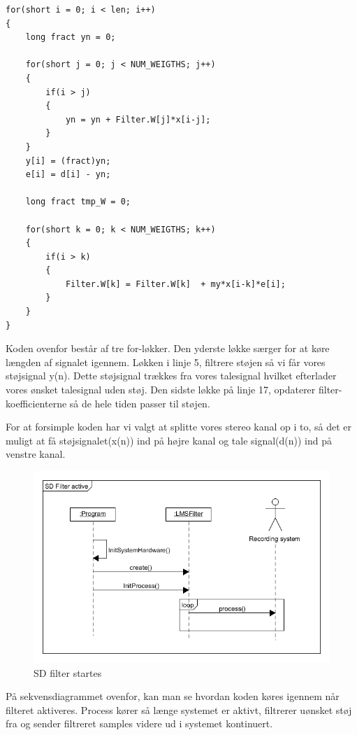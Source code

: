 \newpage


\begin{lstlisting}
for(short i = 0; i < len; i++)
{
	long fract yn = 0;

	for(short j = 0; j < NUM_WEIGTHS; j++)
	{
		if(i > j)
		{
			yn = yn + Filter.W[j]*x[i-j];
		}
	}
	y[i] = (fract)yn;
	e[i] = d[i] - yn;
		
	long fract tmp_W = 0;
		
	for(short k = 0; k < NUM_WEIGTHS; k++)
	{
		if(i > k)
		{
			Filter.W[k] = Filter.W[k]  + my*x[i-k]*e[i];
		}
	}
}
\end{lstlisting}

Koden ovenfor består af tre for-løkker. Den yderste løkke særger for at køre længden af signalet igennem. Løkken i linje 5, filtrere støjen så vi får vores støjsignal y(n). Dette støjsignal trækkes fra vores talesignal hvilket efterlader vores ønsket talesignal uden støj. Den sidste løkke på linje 17, opdaterer filter-koefficienterne så de hele tiden passer til støjen.

For at forsimple koden har vi valgt at splitte vores stereo kanal op i to, så det er muligt at få støjsignalet(x(n)) ind på højre kanal og tale signal(d(n)) ind på venstre kanal.


\begin{figure}[H]
	\centering
	\includegraphics[width = 400pt]{Img/SD_filter_active.png}
	\caption{SD filter startes}
	\label{fig:SD}
\end{figure}
På sekvensdiagrammet ovenfor, kan man se hvordan koden køres igennem når filteret aktiveres. Process kører så længe systemet er aktivt, filtrerer uønsket støj fra og sender filtreret samples videre ud i systemet kontinuert.
